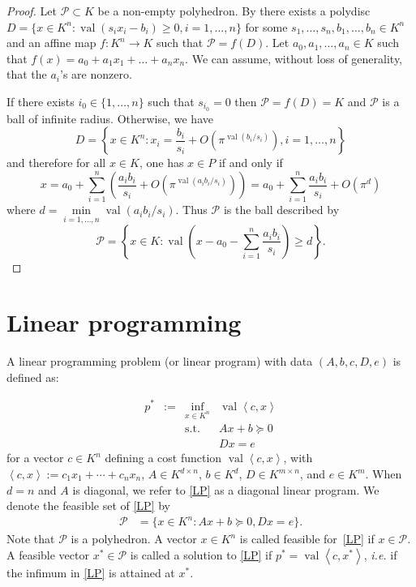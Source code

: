 \documentclass{elsarticle}
\theoremstyle{plain}
\theoremstyle{definition}
\newcommand{\PP}{\mathcal{P}}
\DeclareMathOperator{\val}{val}
\begin{document}
\begin{proof}
    Let $\PP \subset K$ be a non-empty polyhedron. By  there exists a polydisc $D = \{x \in K^n : \val(s_i x_i - b_i) \ge 0, i=1,\ldots,n \}$ for some $s_1,\ldots,s_n, b_1,\ldots,b_n \in K ^n$ and an affine map $f : K^n \to K$ such that $\PP = f(D)$. Let $a_0,a_1,\ldots,a_n \in K$ such that $f(x) = a_0 + a_1 x_1 + \ldots + a_n x_n$. We can assume, without loss of generality, that the $a_i$'s are nonzero. 

    If there exists $i_0 \in \{1,\ldots,n\}$ such that $s_{i_0} = 0$ then $\PP = f(D) = K$ and $\PP$ is a ball of infinite radius. Otherwise, we have
    $$
    D = \left\{x \in K^n : x_i = \frac{b_i}{s_i} + O\left( \pi^{\val(b_i/s_i)} \right), i=1,\ldots,n\right\}
    $$
    and therefore for all $x \in K$, one has $x \in P$ if and only if
    $$
    x = a_0 + \sum_{i=1}^{n}\left(\frac{a_i b_i}{s_i} + O( \pi^{\val(a_i b_i/s_i)}) \right)
    = a_0  + \sum_{i=1}^{n} \frac{a_i b_i}{s_i} + O(\pi^d)
    $$
    where $d = \min \limits_{i = 1,\ldots,n} \val(a_i b_i/s_i)$. Thus
    $\PP$ is the ball described by
    $$
    \PP = \left\{x \in K : \val\left(x - a_0 - \sum_{i=1}^{n} \frac{a_i b_i}{s_i}\right) \ge d\right\}.
    $$
\end{proof}





\section{Linear programming}
\label{sec:LP}
A {linear programming problem} (or {linear program})
{with data $(A,b,c,\allowbreak D,e)$} is defined as:

\begin{equation}
  \tag{LP}\label{LP}
\begin{array}{rcll}
  p^* & := & \inf_{x \in K^n} & \val \left\langle c, x \right\rangle \\
  &    & \text{s.t.}         & A x + b \succeq 0\\
  & & & D x = e
\end{array}
\end{equation}
for a vector $c \in K^n$ defining a cost function $\val\left\langle c, x \right\rangle$,
with $\left\langle c, x \right\rangle := c_1 x_1+\cdots +c_n x_n$,
$A \in K^{d \times n}$, $b \in K^d$, $D \in K^{m\times n}$, and $e \in K^m$.
When $d=n$ and $A$ is diagonal, %
we refer to \eqref{LP} as a {diagonal} linear program.
We denote the {feasible set} of \eqref{LP} by
\begin{equation*}
\begin{aligned}
  \PP &= \{x \in K^n : Ax + b \succeq 0, Dx = e\}.
\end{aligned}
\end{equation*}
Note that $\PP$ is a polyhedron.
A vector $x \in K^n$ is called {feasible} for~\eqref{LP} if $x \in \PP$. A feasible vector $x^* \in \PP$ is called a {solution} to \eqref{LP} if $p^* = \val\left\langle c,x^*\right\rangle$, {\it i.e.} if the infimum in \eqref{LP} is attained at $x^*$.
\end{document}
